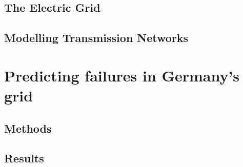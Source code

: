 \documentclass{report}
\theoremstyle{definition}
\theoremstyle{remark}
\begin{document}
\chapter{The Electric Grid}\label{chap:grid}


\chapter{Modelling Transmission Networks}\label{chap:model}


\part{Predicting failures in Germany's grid}\label{part:sim}

\chapter{Methods}\label{chap:methods}


\chapter{Results}\label{chap:results}




\end{document}
